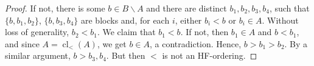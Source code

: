 \documentclass[10pt,a4paper]{article}
\DeclareMathOperator{\cl}{cl}
\theoremstyle{note}
\begin{document}
\begin{proof}   If not, there is some $b\in B\smallsetminus A$ and there are distinct $b_1,b_2,b_3,b_4$, such that  $\{b,b_1,b_2\}$,  $\{b,b_3,b_4\}$  are  blocks and, for each $i$, either $b_i < b$ or $b_i \in A$.   Without loss of generality,  $b_2 <b_1$. We claim that $b_1 < b$.  If not, then   $b_1\in A$ and $b <b_1$,  and since $A=\cl_<(A)$, we get $b \in A$, a contradiction. Hence,  $b>b_1>b_2$. By a similar argument, $b> b_3,b_4$.  But then $<$ is not an HF-ordering.
\end{proof}
\end{document}

